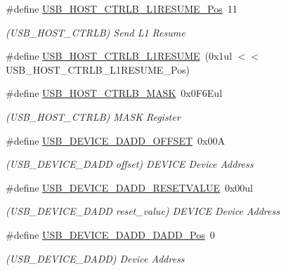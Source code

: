 \begin{DoxyCompactItemize}
\item 
\#define \mbox{\hyperlink{group___s_a_m_d21___u_s_b_ga4c9a833dc120257bf101713b9ead8131}{U\+S\+B\+\_\+\+H\+O\+S\+T\+\_\+\+C\+T\+R\+L\+B\+\_\+\+L1\+R\+E\+S\+U\+M\+E\+\_\+\+Pos}}~11
\begin{DoxyCompactList}\small\item\em (U\+S\+B\+\_\+\+H\+O\+S\+T\+\_\+\+C\+T\+R\+LB) Send L1 Resume \end{DoxyCompactList}\item 
\#define \mbox{\hyperlink{group___s_a_m_d21___u_s_b_gacee9fe6a19bcde9c53ae9c4e88665294}{U\+S\+B\+\_\+\+H\+O\+S\+T\+\_\+\+C\+T\+R\+L\+B\+\_\+\+L1\+R\+E\+S\+U\+ME}}~(0x1ul $<$$<$ U\+S\+B\+\_\+\+H\+O\+S\+T\+\_\+\+C\+T\+R\+L\+B\+\_\+\+L1\+R\+E\+S\+U\+M\+E\+\_\+\+Pos)
\item 
\#define \mbox{\hyperlink{group___s_a_m_d21___u_s_b_gaa78947196ae372e8ff9218773d935924}{U\+S\+B\+\_\+\+H\+O\+S\+T\+\_\+\+C\+T\+R\+L\+B\+\_\+\+M\+A\+SK}}~0x0\+F6\+Eul
\begin{DoxyCompactList}\small\item\em (U\+S\+B\+\_\+\+H\+O\+S\+T\+\_\+\+C\+T\+R\+LB) M\+A\+SK Register \end{DoxyCompactList}\item 
\#define \mbox{\hyperlink{group___s_a_m_d21___u_s_b_ga0f3542ac45dbe09bb59c4ee4e78d09d0}{U\+S\+B\+\_\+\+D\+E\+V\+I\+C\+E\+\_\+\+D\+A\+D\+D\+\_\+\+O\+F\+F\+S\+ET}}~0x00A
\begin{DoxyCompactList}\small\item\em (U\+S\+B\+\_\+\+D\+E\+V\+I\+C\+E\+\_\+\+D\+A\+DD offset) D\+E\+V\+I\+CE Device Address \end{DoxyCompactList}\item 
\#define \mbox{\hyperlink{group___s_a_m_d21___u_s_b_gae3708710b894fe84bcf61a4ea6552adb}{U\+S\+B\+\_\+\+D\+E\+V\+I\+C\+E\+\_\+\+D\+A\+D\+D\+\_\+\+R\+E\+S\+E\+T\+V\+A\+L\+UE}}~0x00ul
\begin{DoxyCompactList}\small\item\em (U\+S\+B\+\_\+\+D\+E\+V\+I\+C\+E\+\_\+\+D\+A\+DD reset\+\_\+value) D\+E\+V\+I\+CE Device Address \end{DoxyCompactList}\item 
\#define \mbox{\hyperlink{group___s_a_m_d21___u_s_b_gac1a51843cc66433e2fdcbf772de3363f}{U\+S\+B\+\_\+\+D\+E\+V\+I\+C\+E\+\_\+\+D\+A\+D\+D\+\_\+\+D\+A\+D\+D\+\_\+\+Pos}}~0
\begin{DoxyCompactList}\small\item\em (U\+S\+B\+\_\+\+D\+E\+V\+I\+C\+E\+\_\+\+D\+A\+DD) Device Address \end{DoxyCompactList}\item 
$$
\end{DoxyCompactItemize}
